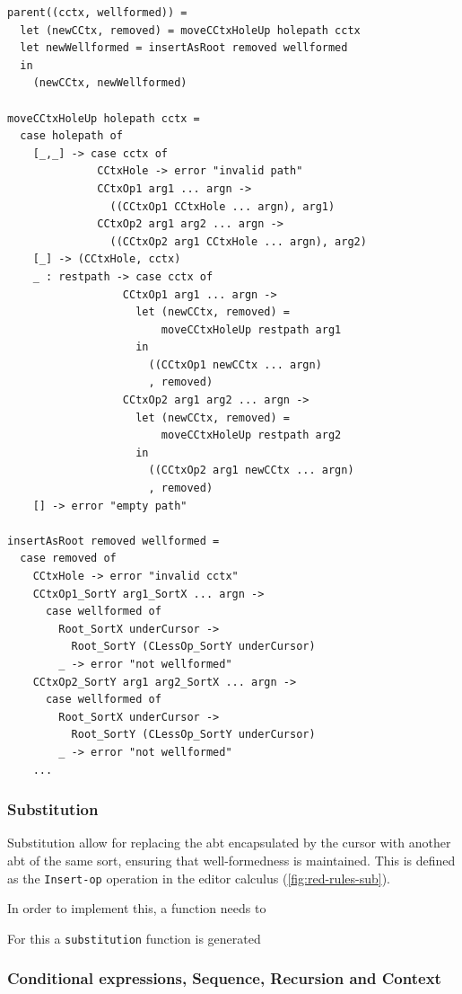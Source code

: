 \begin{lstlisting}[style=inline,caption={Pseudocode for applying parent operator},label={lst:cursor-movement-parent-pseudocode}]
parent((cctx, wellformed)) =
  let (newCCtx, removed) = moveCCtxHoleUp holepath cctx
  let newWellformed = insertAsRoot removed wellformed
  in
    (newCCtx, newWellformed)

moveCCtxHoleUp holepath cctx =
  case holepath of
    [_,_] -> case cctx of
              CCtxHole -> error "invalid path"
              CCtxOp1 arg1 ... argn -> 
                ((CCtxOp1 CCtxHole ... argn), arg1)
              CCtxOp2 arg1 arg2 ... argn -> 
                ((CCtxOp2 arg1 CCtxHole ... argn), arg2)
    [_] -> (CCtxHole, cctx)
    _ : restpath -> case cctx of
                  CCtxOp1 arg1 ... argn ->
                    let (newCCtx, removed) = 
                        moveCCtxHoleUp restpath arg1
                    in
                      ((CCtxOp1 newCCtx ... argn)
                      , removed)
                  CCtxOp2 arg1 arg2 ... argn ->
                    let (newCCtx, removed) = 
                        moveCCtxHoleUp restpath arg2
                    in
                      ((CCtxOp2 arg1 newCCtx ... argn)
                      , removed)
    [] -> error "empty path" 

insertAsRoot removed wellformed =
  case removed of
    CCtxHole -> error "invalid cctx"
    CCtxOp1_SortY arg1_SortX ... argn -> 
      case wellformed of
        Root_SortX underCursor ->
          Root_SortY (CLessOp_SortY underCursor)
        _ -> error "not wellformed"
    CCtxOp2_SortY arg1 arg2_SortX ... argn ->
      case wellformed of
        Root_SortX underCursor ->
          Root_SortY (CLessOp_SortY underCursor)
        _ -> error "not wellformed"
    ...
\end{lstlisting}

\subsubsection{Substitution}
Substitution allow for replacing the abt encapsulated by the cursor with another
abt of the same sort, ensuring that well-formedness is maintained.
This is defined as the \texttt{Insert-op} operation in the editor calculus
(\cref{fig:red-rules-sub}).

In order to implement this, a function needs to

For this a \texttt{substitution} function is generated

\subsubsection{Conditional expressions, Sequence, Recursion and Context}

